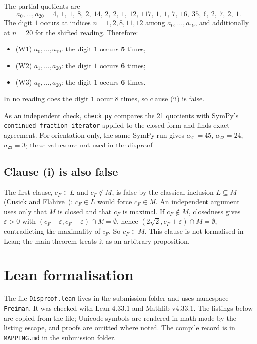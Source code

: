 \documentclass[11pt]{article}
\begin{document}
The partial quotients are
\[
a_0, \dots, a_{20} = 4,\ 1,\ 1,\ 8,\ 2,\ 14,\ 2,\ 2,\ 1,\ 12,\ 117,\ 1,\ 1,\ 7,\ 16,\ 35,\ 6,\ 2,\ 7,\ 2,\ 1 .
\]
The digit $1$ occurs at indices $n = 1, 2, 8, 11, 12$ among $a_0, \dots, a_{19}$, and additionally at $n = 20$ for the shifted reading. Therefore:
\begin{itemize}
\item (W1) $a_0, \dots, a_{19}$: the digit $1$ occurs \textbf{5} times;
\item (W2) $a_1, \dots, a_{20}$: the digit $1$ occurs \textbf{6} times;
\item (W3) $a_0, \dots, a_{20}$: the digit $1$ occurs \textbf{6} times.
\end{itemize}
In no reading does the digit $1$ occur $8$ times, so clause (ii) is false.

As an independent check, \texttt{check.py} compares the 21 quotients with SymPy's
\texttt{continued\_fraction\_iterator} applied to the closed form and finds exact agreement.
For orientation only, the same SymPy run gives $a_{21} = 45$, $a_{22} = 24$, $a_{23} = 3$; these
values are not used in the disproof.

\subsection{Clause (i) is also false}

The first clause, $c_F \in L$ and $c_F \notin M$, is false by the classical inclusion
$L \subseteq M$ (Cusick and Flahive~\cite{CF}): $c_F \in L$ would force $c_F \in M$. An independent
argument uses only that $M$ is closed and that $c_F$ is maximal. If $c_F \notin M$, closedness
gives $\varepsilon > 0$ with $(c_F - \varepsilon, c_F + \varepsilon) \cap M = \emptyset$, hence
$(2\sqrt{2}, c_F + \varepsilon) \cap M = \emptyset$, contradicting the maximality of $c_F$. So
$c_F \in M$. This clause is not formalised in Lean; the main theorem treats it as an arbitrary
proposition.

\section{Lean formalisation}

The file \texttt{Disproof.lean} lives in the submission folder and uses namespace
\texttt{Freiman}. It was checked with Lean 4.33.1 and Mathlib v4.33.1. The listings below are copied from the file;
Unicode symbols are rendered in math mode by the listing escape, and proofs are omitted where
noted. The compile record is in \texttt{MAPPING.md} in the submission folder.
\end{document}
